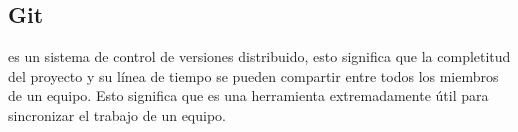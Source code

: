 \subsection{Git}
   es un sistema de control de versiones distribuido, esto significa que la completitud
  del proyecto y su línea de tiempo se pueden compartir entre todos los miembros de un equipo.
  Esto significa que es una herramienta extremadamente útil para sincronizar el trabajo de un 
  equipo.